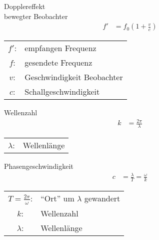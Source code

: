 \begin{karte}{Dopplereffekt\\ bewegter Beobachter}
    \begin{align*}
        f' &= f_0 ( 1 + \frac {v}{c} )
    \end{align*}
    \begin{tabular}[t]{cl}
        \( f' \): & empfangen Frequenz \\
        \( f \): & gesendete Frequenz \\
        \( v \): & Geschwindigkeit Beobachter\\
        \( c \): & Schallgeschwindigkeit \\
    \end{tabular}
\end{karte}

\begin{karte}{Wellenzahl}
    \begin{align*}
        k &= \frac{2 \pi}{\lambda}
    \end{align*}
    \begin{tabular}[t]{cl}
        \( \lambda \): & Wellenlänge \\
    \end{tabular}
\end{karte}

\begin{karte}{Phasengeschwindigkeit}
    \begin{align*}
        c &= \frac{\lambda}{T} = \frac{\omega}{k}
    \end{align*}
    \begin{tabular}[t]{cl}
        \( T = \tfrac {2\pi}{\omega}\): & ``Ort'' um \(\lambda\) gewandert \\
        \( k \): &  Wellenzahl \\
        \( \lambda \): & Wellenlänge \\
    \end{tabular}
\end{karte}
